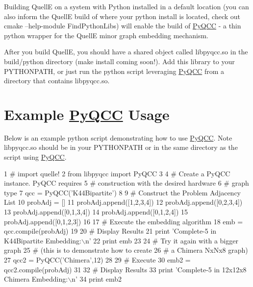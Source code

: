 Building QuellE on a system with Python installed in a default location (you can also inform the QuellE build of where your python install is located, check out cmake --help-\/module Find\+Python\+Libs) will enable the build of \hyperlink{a00096}{Py\+Q\+CC} -\/ a thin python wrapper for the QuellE minor graph embedding mechanism.

After you build QuellE, you should have a shared object called libpyqcc.\+so in the build/python directory (make install coming soon!). Add this library to your P\+Y\+T\+H\+O\+N\+P\+A\+TH, or just run the python script leveraging \hyperlink{a00096}{Py\+Q\+CC} from a directory that contains libpyqcc.\+so.

\section*{Example \hyperlink{a00096}{Py\+Q\+CC} Usage}

Below is an example python script demonstrating how to use \hyperlink{a00096}{Py\+Q\+CC}. Note libpyqcc.\+so should be in your P\+Y\+T\+H\+O\+N\+P\+A\+TH or in the same directory as the script using \hyperlink{a00096}{Py\+Q\+CC}.


\begin{DoxyCode}
1 # import quelle!
2 from libpyqcc import PyQCC
3 
4 # Create a PyQCC instance. PyQCC requires
5 # construction with the desired hardware 
6 # graph type
7 qcc = PyQCC('K44Bipartite')
8 
9 # Construct the Problem Adjacency List
10 probAdj = []
11 probAdj.append([1,2,3,4])
12 probAdj.append([0,2,3,4])
13 probAdj.append([0,1,3,4])
14 probAdj.append([0,1,2,4])
15 probAdj.append([0,1,2,3])
16 
17 # Execute the embedding algorithm
18 emb = qcc.compile(probAdj)
19 
20 # Display Results
21 print 'Complete-5 in K44Bipartite Embedding:\(\backslash\)n'
22 print emb
23 
24 # Try it again with a bigger graph 
25 # (this is to demonstrate how to create 
26 # a Chimera NxNx8 graph)
27 qcc2 = PyQCC('Chimera',12)
28 
29 # Execute
30 emb2 = qcc2.compile(probAdj)
31 
32 # Display Results
33 print 'Complete-5 in 12x12x8 Chimera Embedding:\(\backslash\)n'
34 print emb2
\end{DoxyCode}
 